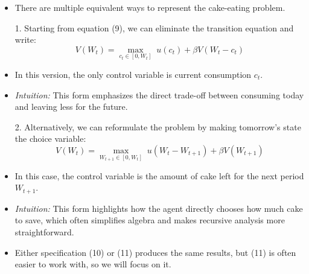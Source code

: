 \documentclass[12pt]{article}
\begin{document}
\begin{itemize}
    \item There are multiple equivalent ways to represent the cake-eating problem.

    \item[1.] Starting from equation (9), we can eliminate the transition equation and write:
    \[
    V(W_t) = \max_{c_t \in [0, W_t]} \; u(c_t) + \beta V(W_t - c_t) \tag{10}
    \]
    \item In this version, the only control variable is current consumption \( c_t \).
    \item \textit{Intuition:} This form emphasizes the direct trade-off between consuming today and leaving less for the future.

    \item[2.] Alternatively, we can reformulate the problem by making tomorrow’s state the choice variable:
    \[
    V(W_t) = \max_{W_{t+1} \in [0, W_t]} \; u(W_t - W_{t+1}) + \beta V(W_{t+1}) \tag{11}
    \]
    \item In this case, the control variable is the amount of cake left for the next period \( W_{t+1} \).
    \item \textit{Intuition:} This form highlights how the agent directly chooses how much cake to save, which often simplifies algebra and makes recursive analysis more straightforward.

    \item Either specification (10) or (11) produces the same results, but (11) is often easier to work with, so we will focus on it.
\end{itemize}
\end{document}
